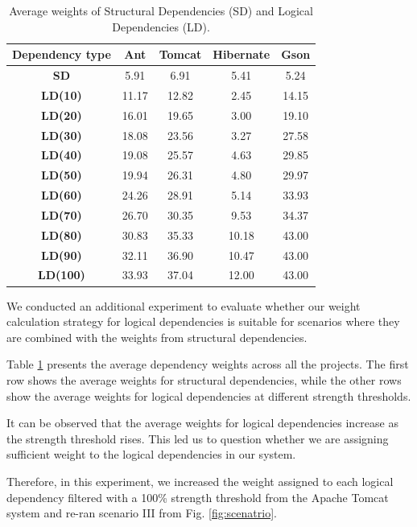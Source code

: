 \documentclass{ieeeaccess}
\begin{document}
\begin{table}[htbp]
\centering
\begin{tabular}{|c|c|c|c|c|}
\hline
\textbf{Dependency type} & \textbf{Ant} & \textbf{Tomcat} & \textbf{Hibernate} & \textbf{Gson} \\ \hline
\rowcolor[HTML]{ECECEC}\textbf{SD}     & 5.91  & 6.91  & 5.41  & 5.24  \\
\textbf{LD(10)} & 11.17 & 12.82 & 2.45  & 14.15 \\
\textbf{LD(20)} & 16.01 & 19.65 & 3.00  & 19.10 \\ 
\textbf{LD(30)} & 18.08 & 23.56 & 3.27  & 27.58 \\ 
\textbf{LD(40)} & 19.08 & 25.57 & 4.63  & 29.85 \\ 
\textbf{LD(50)} & 19.94 & 26.31 & 4.80  & 29.97 \\ 
\textbf{LD(60)} & 24.26 & 28.91 & 5.14  & 33.93 \\ 
\textbf{LD(70)} & 26.70 & 30.35 & 9.53  & 34.37 \\ 
\textbf{LD(80)} & 30.83 & 35.33 & 10.18 & 43.00 \\ 
\textbf{LD(90)} & 32.11 & 36.90 & 10.47 & 43.00 \\ 
\textbf{LD(100)} & 33.93 & 37.04 & 12.00 & 43.00 \\
 \hline
\end{tabular}
\caption{Average weights of Structural Dependencies (SD) and Logical Dependencies (LD).}
\label{tab:systems_weights}
\end{table}

We conducted an additional experiment to evaluate whether our weight calculation strategy for logical dependencies is suitable for scenarios where they are combined with the weights from structural dependencies.

Table \ref{tab:systems_weights} presents the average dependency weights across all the projects. The first row shows the average weights for structural dependencies, while the other rows show the average weights for logical dependencies at different strength thresholds.

It can be observed that the average weights for logical dependencies increase as the strength threshold rises. This led us to question whether we are assigning sufficient weight to the logical dependencies in our system.

Therefore, in this experiment, we increased the weight assigned to each logical dependency filtered with a 100\% strength threshold from the Apache Tomcat system and re-ran scenario III from Fig. \ref{fig:scenatrio}.
\end{document}
